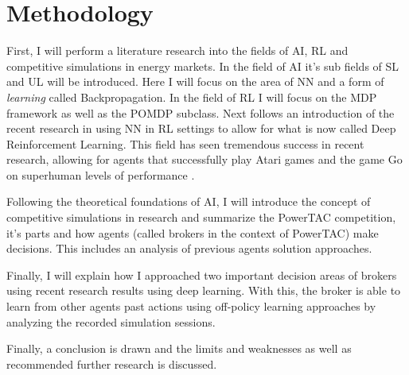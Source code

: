 \section{Methodology}
First, I will perform a literature research into the fields of \ac{AI}, \ac{RL} and competitive simulations in energy
markets. In the field of AI
it's sub fields of \ac {SL}  and \ac {UL}  will be introduced. Here I will focus on the area of \ac{NN} and a form of
\emph{learning}  called Backpropagation. In the field of \ac{RL} I will focus on the \ac{MDP} framework as well as the
\ac{POMDP} subclass.  Next follows an introduction of the recent research in using \ac{NN} in \ac{RL} settings to allow
for what is now called Deep Reinforcement Learning. This field has seen tremendous success in recent research, allowing
for agents that successfully play Atari games and the game Go on superhuman levels of performance 
\citep{proximalpolicyopt, silver2016mastering}.


Following the theoretical foundations of \ac{AI},  I will introduce the concept of competitive simulations in research
and summarize the \ac{PowerTAC} competition, it's parts and how agents (called brokers in the context of \ac{PowerTAC})
make decisions. This includes an analysis of previous agents solution approaches. 

Finally, I will explain how I approached two important decision areas of brokers using recent research results using
deep learning. With this, the broker is able to learn from other agents past actions using off-policy learning
approaches by analyzing the recorded simulation sessions. 

Finally, a conclusion is drawn and the limits and weaknesses as well as recommended further research is discussed.
